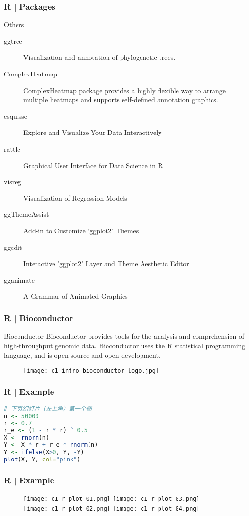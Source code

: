 \begin{frame}[fragile]
  \frametitle{R | Packages}
  \begin{block}{Others}
    \begin{description}
      \item[\alert{ggtree}] Visualization and annotation of \alert{phylogenetic trees}.
      \item[\alert{ComplexHeatmap}] ComplexHeatmap package provides a highly flexible way to arrange multiple \alert{heatmaps} and supports self-defined annotation graphics. 
      \item[esquisse] Explore and Visualize Your Data Interactively
      \item[rattle] Graphical User Interface for Data Science in R
      \item[visreg] Visualization of Regression Models
      \item[ggThemeAssist] Add-in to Customize `ggplot2' Themes
      \item[ggedit] Interactive 'ggplot2' Layer and Theme Aesthetic Editor
      \item[gganimate] A Grammar of Animated Graphics
    \end{description}
  \end{block}
\end{frame}

\begin{frame}
  \frametitle{R | \alert{Bioconductor}}
  \begin{block}{Bioconductor}
    Bioconductor provides tools for the analysis and comprehension of high-throughput genomic data. Bioconductor uses the R statistical programming language, and is open source and open development.
  \end{block}
  \begin{figure}
    \centering
    \texttt{[image: c1\_intro\_bioconductor\_logo.jpg]}
  \end{figure}
\end{frame}

\begin{frame}[fragile]
  \frametitle{R | Example}
\begin{lstlisting}[language=R]
# 下页幻灯片（左上角）第一个图
n <- 50000
r <- 0.7
r_e <- (1 - r * r) ^ 0.5
X <- rnorm(n)
Y <- X * r + r_e * rnorm(n)
Y <- ifelse(X>0, Y, -Y)
plot(X, Y, col="pink")
\end{lstlisting}
\end{frame}

\begin{frame}
  \frametitle{R | Example}
  \begin{figure}
    \centering
    \texttt{[image: c1\_r\_plot\_01.png]}\qquad
    \texttt{[image: c1\_r\_plot\_03.png]}\\
    \texttt{[image: c1\_r\_plot\_02.png]}
    \hspace{4em}
    \texttt{[image: c1\_r\_plot\_04.png]}
  \end{figure}
\end{frame}

